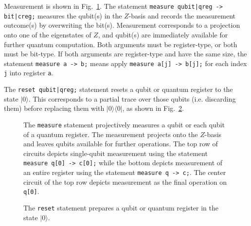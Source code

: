 \documentclass[USenglish,12pt,fleqn]{article} %
\newcommand*{\code}{\texttt}
\begin{document}
Measurement is shown in Fig.~\ref{fig:measure}. The statement \code{measure qubit|qreg -> bit|creg;} measures the qubit(s) in the $Z$-basis and records the measurement outcome(s) by overwriting the bit(s). Measurement corresponds to a projection onto one of the eigenstates of $Z$, and qubit(s) are immediately available for further quantum computation. Both arguments must be register-type, or both must be bit-type. If both arguments are register-type and have the same size, the statement \code{measure a -> b;} means apply \code{measure a[j] -> b[j];} for each index \code{j} into register \code{a}.

The \code{reset qubit|qreg;} statement resets a qubit or quantum register to the state $|0\rangle$. This corresponds to a partial trace over those qubits (i.e. discarding them) before replacing them with $|0\rangle\langle 0|$, as shown in Fig.~\ref{fig:prepare}.

\begin{figure}
\begin{minipage}{.3\textwidth}
\centering
\end{minipage}
\begin{minipage}{.3\textwidth}
\centering
\end{minipage}
\begin{minipage}{.3\textwidth}
\centering
\end{minipage}

\begin{minipage}{.3\textwidth}
\centering
\end{minipage}
\begin{minipage}{.3\textwidth}
\centering
\end{minipage}
\begin{minipage}{.3\textwidth}
\centering
\end{minipage}
\caption{The \code{measure} statement projectively measures a qubit or each qubit of a quantum register. The measurement projects onto the $Z$-basis and leaves qubits available for further operations. The top row of circuits depicts single-qubit measurement using the statement \code{measure q[0] -> c[0];} while the bottom depicts measurement of an entire register using the statement \code{measure q -> c;}. The center circuit of the top row depicts measurement as the final operation on \code{q[0]}.
\label{fig:measure}}
\end{figure}

\begin{figure}
\begin{minipage}{.3\textwidth}
\centering

\end{minipage}
\begin{minipage}{.3\textwidth}
\centering
\end{minipage}
\begin{minipage}{.3\textwidth}
\centering
\end{minipage}
\caption{The \code{reset} statement prepares a qubit or quantum register in the state $|0\rangle$.
\label{fig:prepare}}
\end{figure}
\end{document}

